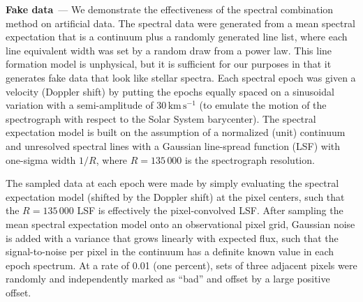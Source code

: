 \documentclass[modern]{aastex631}
\renewcommand{\paragraph}[1]{\medskip\par\noindent\textbf{#1}~---}
\newcommand{\unit}[1]{\mathrm{#1}}
\newcommand{\kmps}{\unit{km\,s^{-1}}}
\begin{document}
\paragraph{Fake data}
We demonstrate the effectiveness of the spectral combination method on artificial data.
The spectral data were generated from a mean spectral expectation that is a continuum plus a randomly generated line list, where each line equivalent width was set by a random draw from a power law. 
This line formation model is unphysical, but it is sufficient for our purposes in that it generates fake data that look like stellar spectra.
Each spectral epoch was given a velocity (Doppler shift) by putting the epochs equally spaced on a sinusoidal variation with a semi-amplitude of $30\,\kmps$ (to emulate the motion of the spectrograph with respect to the Solar System barycenter).
The spectral expectation model is built on the assumption of a normalized (unit) continuum and unresolved spectral lines with a Gaussian line-spread function (LSF) with one-sigma width $1/R$, where $R=135\,000$ is the spectrograph resolution.

The sampled data at each epoch were made by simply evaluating the spectral expectation model (shifted by the Doppler shift) at the pixel centers, such that the $R=135\,000$ LSF is effectively the pixel-convolved LSF.
After sampling the mean spectral expectation model onto an observational pixel grid, Gaussian noise is added with a variance that grows linearly with expected flux, such that the signal-to-noise per pixel in the continuum has a definite known value in each epoch spectrum.
At a rate of 0.01 (one percent), sets of three adjacent pixels were randomly and independently marked as ``bad'' and offset by a large positive offset.
\end{document}
